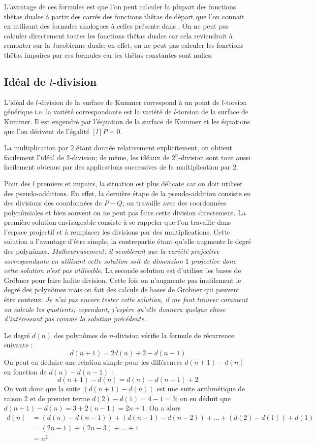 \documentclass[a4paper]{article}
\theoremstyle{definition}
\theoremstyle{remark}
\numberwithin{equation}{section}
\begin{document}
L'avantage de ces formules est que l'on peut calculer la plupart des fonctions thêtas duales à partir des carrés des fonctions thêtas de départ que l'on connait en utilisant des formules analogues à celles présente dans \citep{gaudry}. On ne peut pas calculer directement toutes les fonctions thêtas duales car cela reviendrait à remonter sur la Jacobienne duale; en effet, on ne peut pas calculer les fonctions thêtas impaires par ces formules car les thêtas constantes sont nulles.

\subsection{Idéal de $l$-division}
L'idéal de $l$-division de la surface de Kummer correspond à un point de $l$-torsion générique i.e. la variété correspondante est la variété de $l$-torsion de la surface de Kummer. Il est engendré par l'équation de la surface de Kummer et les équations que l'on dérivent de l'égalité $[l]P=0$.

La multiplication par $2$ étant donnée relativement explicitement, on obtient facilement l'idéal de $2$-division; de même, les idéaux de $2^n$-division sont tout aussi facilement obtenus par des applications successives de la multiplication par $2$.

Pour des $l$ premiers et impairs, la situation est plus délicate car on doit utiliser des pseudo-additions. En effet, la dernière étape de la pseudo-addition consiste en des divisions des coordonnées de $P-Q$; on travaille avec des coordonnées polynômiales et bien souvent on ne peut pas faire cette division directement. La première solution envisageable consiste à se rappeler que l'on travaille dans l'espace projectif et à remplacer les divisions par des multiplications. Cette solution a l'avantage d'être simple, la contrepartie étant qu'elle augmente le degré des polynômes. \emph{Malheureusement, il semblerait que la variété projective correspondante en utilisant cette solution soit de dimension $1$ projective donc cette solution n'est pas utilisable.}
La seconde solution est d'utiliser les bases de Gröbner pour faire ladite division. Cette fois on n'augmente pas inutilement le degré des polynômes mais on fait des calculs de bases de Gröbner qui peuvent être couteux. \emph{Je n'ai pas encore tester cette solution, il me faut trouver comment on calcule les quotients; cependant, j'espère qu'elle donnera quelque chose d'intéressant pas comme la solution précédente.}

Le degré $d(n)$ des polynômes de $n$-division vérifie la formule de récurrence suivante :
$$d(n+1) = 2d(n) + 2 - d(n-1)$$
On peut en déduire une relation simple pour les différences $d(n+1)-d(n)$ en fonction de $d(n)-d(n-1)$ :
$$d(n+1)-d(n) = d(n) - d(n-1) + 2$$
On voit donc que la suite $(d(n+1)-d(n))$ est une suite arithmétique de raison $2$ et de premier terme $d(2)-d(1) = 4 - 1 = 3$; on en déduit que $d(n+1)-d(n) = 3 + 2(n-1) = 2n + 1$.
On a alors
\begin{align*}
d(n) &= (d(n) - d(n-1)) + (d(n-1) - d(n-2)) + ... + (d(2)-d(1)) + d(1) \\
	&= (2n-1) + (2n - 3) + ... + 1 \\
	&= n^2
\end{align*}
\end{document}
